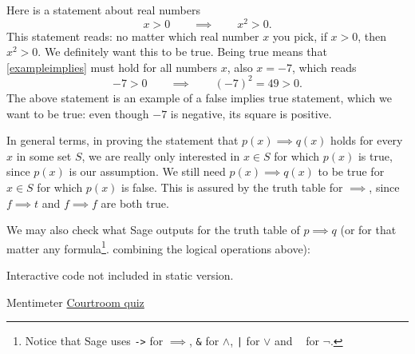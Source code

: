 \begin{tcolorbox}
  \begin{remark}
    Here is a statement about real numbers
    \begin{equation}\label{exampleimplies}
      x > 0 \qquad \implies \qquad x^2 > 0.
    \end{equation}
    This statement reads: no matter which real number $x$ you pick, if $x > 0$,
    then $x^2 > 0$. We definitely want this to be true. Being true means
    that \eqref{exampleimplies} must hold for all numbers $x$, also $x = -7$,
    which reads
    $$
      - 7 > 0 \qquad \implies \qquad (-7)^2 = 49 > 0.
    $$
    The above statement is an example of a false implies true statement, which
    we want to be true: even though $-7$ is negative, its square is positive.

    In general terms, in proving the statement that $p(x) \implies q(x)$ holds for every $x$ in
    some set $S$, we are really only interested in $x\in S$ for which $p(x)$ is true, since
    $p(x)$ is our assumption. We still need $p(x)\implies q(x)$ to be true for $x\in S$ for
    which $p(x)$ is false. This is assured by the truth table for $\implies$, since
    $f \implies t$ and $f\implies f$ are both true.
  \end{remark}
\end{tcolorbox}

We may also check what Sage outputs for the truth table of $p\implies q$ (or for that
matter any formula\footnote{Notice that Sage uses \texttt{->} for $\implies$, \texttt{\&} for $\land$, \texttt{|} for $\lor$ and \texttt{~} for $\neg$.}.
combining the logical operations above):

\begin{sage} Interactive code not included in static version.\end{sage}

\begin{button}{Mentimeter}
  \href{https://www.mentimeter.com/s/f3d92f930be65ab1a21e5429b8c10405/46f51dd1bbbd}{Courtroom quiz}
\end{button}

